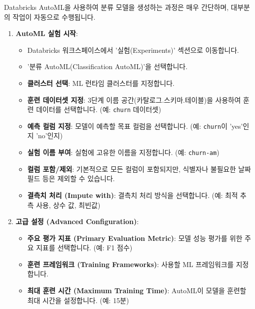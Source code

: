 \documentclass[11pt,a4paper]{article}
\theoremstyle{definition}
\begin{document}
\begin{itemize}
\begin{itemize}
\begin{itemize}
\begin{itemize}
\begin{itemize}
Databricks AutoML을 사용하여 분류 모델을 생성하는 과정은 매우 간단하며, 대부분의 작업이 자동으로 수행됩니다.

\begin{enumerate}
    \item \textbf{AutoML 실험 시작}:
    \begin{itemize}
        \item Databricks 워크스페이스에서 '실험(Experiments)' 섹션으로 이동합니다.
        \item '분류 AutoML(Classification AutoML)'을 선택합니다.
        \item \textbf{클러스터 선택}: ML 런타임 클러스터를 지정합니다.
        \item \textbf{훈련 데이터셋 지정}: 3단계 이름 공간(카탈로그.스키마.테이블)을 사용하여 훈련 데이터를 선택합니다. (예: \texttt{churn} 데이터셋)
        \item \textbf{예측 컬럼 지정}: 모델이 예측할 목표 컬럼을 선택합니다. (예: \texttt{churn}이 'yes'인지 'no'인지)
        \item \textbf{실험 이름 부여}: 실험에 고유한 이름을 지정합니다. (예: \texttt{churn-am})
        \item \textbf{컬럼 포함/제외}: 기본적으로 모든 컬럼이 포함되지만, 식별자나 불필요한 날짜 필드 등은 제외할 수 있습니다.
        \item \textbf{결측치 처리 (Impute with)}: 결측치 처리 방식을 선택합니다. (예: 최적 추측 사용, 상수 값, 최빈값)
    \end{itemize}

    \item \textbf{고급 설정 (Advanced Configuration)}:
    \begin{itemize}
        \item \textbf{주요 평가 지표 (Primary Evaluation Metric)}: 모델 성능 평가를 위한 주요 지표를 선택합니다. (예: F1 점수)
        \item \textbf{훈련 프레임워크 (Training Frameworks)}: 사용할 ML 프레임워크를 지정합니다.
        \item \textbf{최대 훈련 시간 (Maximum Training Time)}: AutoML이 모델을 훈련할 최대 시간을 설정합니다. (예: 15분)
    \end{itemize}


\end{enumerate}
\end{itemize}
\end{itemize}
\end{itemize}
\end{itemize}
\end{itemize}
\end{document}
